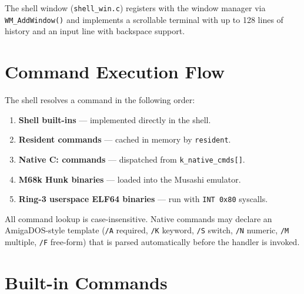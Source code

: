 \documentclass[11pt,a4paper]{report}
\begin{document}
The shell window (\texttt{shell\_win.c}) registers with the window manager
via \texttt{WM\_AddWindow()} and implements a scrollable terminal with
up to 128 lines of history and an input line with backspace support.

\section{Command Execution Flow}

The shell resolves a command in the following order:

\begin{enumerate}
    \item \textbf{Shell built-ins} --- implemented directly in the shell.
    \item \textbf{Resident commands} --- cached in memory by \texttt{resident}.
    \item \textbf{Native C: commands} --- dispatched from \texttt{k\_native\_cmds[]}.
    \item \textbf{M68k Hunk binaries} --- loaded into the Musashi emulator.
    \item \textbf{Ring-3 userspace ELF64 binaries} --- run with \texttt{INT 0x80} syscalls.
\end{enumerate}

All command lookup is case-insensitive.  Native commands may declare an
AmigaDOS-style template (\texttt{/A} required, \texttt{/K} keyword,
\texttt{/S} switch, \texttt{/N} numeric, \texttt{/M} multiple, \texttt{/F}
free-form) that is parsed automatically before the handler is invoked.

\section{Built-in Commands}
\end{document}

